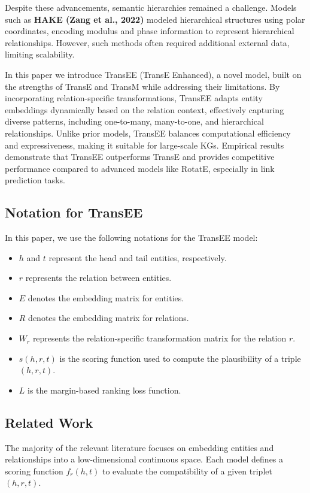 \documentclass[11pt]{article}
\begin{document}
Despite these advancements, semantic hierarchies remained a challenge. Models such as\textbf{ HAKE (Zang et al., 2022)} modeled hierarchical structures using polar coordinates, encoding modulus and phase information to represent hierarchical relationships. However, such methods often required additional external data, limiting scalability.

In this paper we introduce TransEE (TransE Enhanced), a novel model, built on the strengths of TransE and TransM while addressing their limitations. By incorporating relation-specific transformations, TransEE adapts entity embeddings dynamically based on the relation context, effectively capturing diverse patterns, including one-to-many, many-to-one, and hierarchical relationships. Unlike prior models, TransEE balances computational efficiency and expressiveness, making it suitable for large-scale KGs. Empirical results demonstrate that TransEE outperforms TransE and provides competitive performance compared to advanced models like RotatE, especially in link prediction tasks.

\subsection{Notation for TransEE}
In this paper, we use the following notations for the TransEE model:
\begin{itemize}
\item $h$ and $t$ represent the head and tail entities, respectively.
\item $r$ represents the relation between entities.
\item $E$ denotes the embedding matrix for entities.
\item $R$ denotes the embedding matrix for relations.
\item $W_r$ represents the relation-specific transformation matrix for the relation $r$.
\item $s(h, r, t)$ is the scoring function used to compute the plausibility of a triple $(h, r, t)$.
\item $L$ is the margin-based ranking loss function.
\end{itemize}

\subsection{Related Work}
The majority of the relevant literature focuses on embedding entities and relationships into a low-dimensional continuous space. Each model defines a scoring function $f_r(h, t)$ to evaluate the compatibility of a given triplet $(h, r, t)$.
\end{document}
